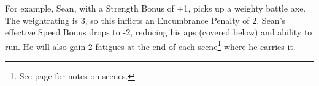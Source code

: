 \begin{exampletext}

  For example, Sean, with a Strength Bonus of +1, picks up a weighty battle axe.
  The \gls{weightrating} is 3, so this inflicts an Encumbrance Penalty of 2.
Sean's effective Speed Bonus drops to -2, reducing his \glspl{ap} (covered below) and ability to run.
He will also gain 2 \glspl{fatigue} at the end of each scene\footnote{See page \pageref{time} for notes on scenes.} where he carries it.

\end{exampletext}


